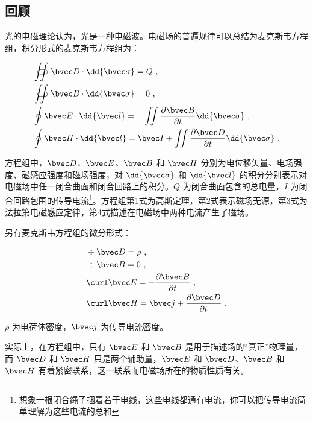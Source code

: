 

\subsection{回顾}

光的电磁理论认为，光是一种电磁波。电磁场的普遍规律可以总结为麦克斯韦方程组，积分形式的麦克斯韦方程组为：

\begin{equation}
\begin{aligned}
& \displaystyle \iint\!\!\!\!\!\!\!\!\!\!\subset\!\supset \bvec D \cdot \dd{\bvec \sigma} = Q ~, \\
& \displaystyle \iint\!\!\!\!\!\!\!\!\!\!\subset\!\supset \bvec B \cdot \dd{\bvec \sigma} = 0 ~, \\
& \oint \bvec E \cdot \dd{\bvec l} = - \iint \frac{\partial \bvec B}{\partial t} \dd{\bvec \sigma} ~, \\
& \oint \bvec H \cdot \dd{\bvec l} = \bvec I + \iint \frac{\partial \bvec D}{\partial t} \dd{\bvec \sigma} ~.
\end{aligned}
\end{equation}

方程组中，$\bvec D$、$\bvec E$、$\bvec B$ 和 $\bvec H$ 分别为电位移矢量、电场强度、磁感应强度和磁场强度，对 $\dd{\bvec \sigma}$ 和 $\dd{\bvec l}$ 的积分分别表示对电磁场中任一闭合曲面和闭合回路上的积分。$Q$ 为闭合曲面包含的总电量，$I$ 为闭合回路包围的传导电流\footnote{想象一根闭合绳子捆着若干电线，这些电线都通有电流，你可以把传导电流简单理解为这些电流的总和}。方程组第1式为高斯定理，第2式表示磁场无源，第3式为法拉第电磁感应定律，第4式描述在电磁场中两种电流产生了磁场。

另有麦克斯韦方程组的微分形式：

\begin{equation}
\begin{aligned}
& \div \bvec D = \rho ~, \\
& \div \bvec B = 0 ~, \\
& \curl \bvec E = -\frac{\partial \bvec B}{\partial t} ~, \\
& \curl \bvec H = \bvec j + \frac{\partial \bvec D}{\partial t} ~.
\end{aligned}
\end{equation}

$\rho$ 为电荷体密度，$\bvec j$ 为传导电流密度。

实际上，在方程组中，只有 $\bvec E$ 和 $\bvec B$ 是用于描述场的“真正”物理量，而 $\bvec D$ 和 $\bvec H$ 只是两个辅助量，$\bvec E$ 和 $\bvec D$、$\bvec B$ 和 $\bvec H$ 有着紧密联系，这一联系而电磁场所在的物质性质有关。


